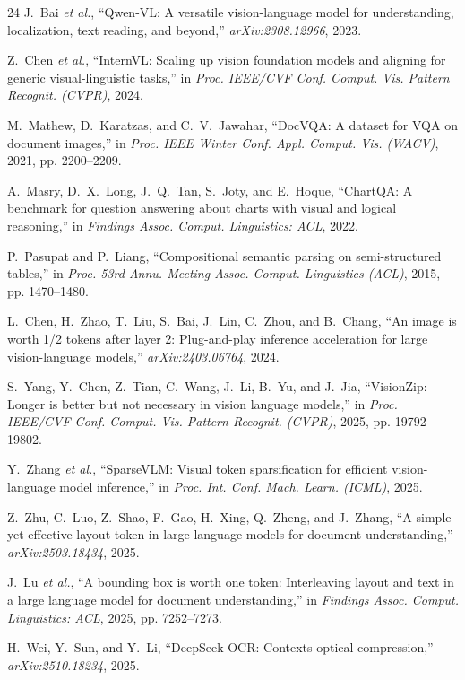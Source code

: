 \documentclass[journal]{IEEEtran}
\begin{document}
\begin{thebibliography}{24}
J.~Bai \emph{et al.}, ``Qwen-VL: A versatile vision-language model for understanding, localization, text reading, and beyond,'' \emph{arXiv:2308.12966}, 2023.

Z.~Chen \emph{et al.}, ``InternVL: Scaling up vision foundation models and aligning for generic visual-linguistic tasks,'' in \emph{Proc. IEEE/CVF Conf. Comput. Vis. Pattern Recognit. (CVPR)}, 2024.

M.~Mathew, D.~Karatzas, and C.~V.~Jawahar, ``DocVQA: A dataset for VQA on document images,'' in \emph{Proc. IEEE Winter Conf. Appl. Comput. Vis. (WACV)}, 2021, pp. 2200--2209.

A.~Masry, D.~X.~Long, J.~Q.~Tan, S.~Joty, and E.~Hoque, ``ChartQA: A benchmark for question answering about charts with visual and logical reasoning,'' in \emph{Findings Assoc. Comput. Linguistics: ACL}, 2022.

P.~Pasupat and P.~Liang, ``Compositional semantic parsing on semi-structured tables,'' in \emph{Proc. 53rd Annu. Meeting Assoc. Comput. Linguistics (ACL)}, 2015, pp. 1470--1480.

L.~Chen, H.~Zhao, T.~Liu, S.~Bai, J.~Lin, C.~Zhou, and B.~Chang, ``An image is worth 1/2 tokens after layer 2: Plug-and-play inference acceleration for large vision-language models,'' \emph{arXiv:2403.06764}, 2024.

S.~Yang, Y.~Chen, Z.~Tian, C.~Wang, J.~Li, B.~Yu, and J.~Jia, ``VisionZip: Longer is better but not necessary in vision language models,'' in \emph{Proc. IEEE/CVF Conf. Comput. Vis. Pattern Recognit. (CVPR)}, 2025, pp. 19792--19802.

Y.~Zhang \emph{et al.}, ``SparseVLM: Visual token sparsification for efficient vision-language model inference,'' in \emph{Proc. Int. Conf. Mach. Learn. (ICML)}, 2025.

Z.~Zhu, C.~Luo, Z.~Shao, F.~Gao, H.~Xing, Q.~Zheng, and J.~Zhang, ``A simple yet effective layout token in large language models for document understanding,'' \emph{arXiv:2503.18434}, 2025.

J.~Lu \emph{et al.}, ``A bounding box is worth one token: Interleaving layout and text in a large language model for document understanding,'' in \emph{Findings Assoc. Comput. Linguistics: ACL}, 2025, pp. 7252--7273.

H.~Wei, Y.~Sun, and Y.~Li, ``DeepSeek-OCR: Contexts optical compression,'' \emph{arXiv:2510.18234}, 2025.


\end{thebibliography}
\end{document}
